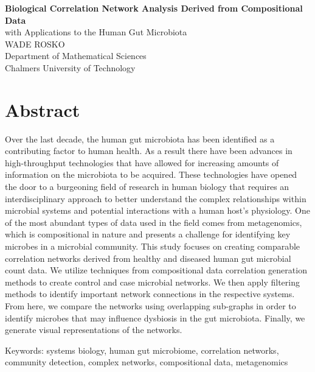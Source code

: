 
\textbf{Biological Correlation Network Analysis Derived from Compositional Data}\\
with Applications to the Human Gut Microbiota\\
WADE ROSKO\\
Department of Mathematical Sciences\\
Chalmers University of Technology \setlength{\parskip}{0.5cm}

\thispagestyle{plain}			%
\setlength{\parskip}{0pt plus 1.0pt}
\section*{Abstract}
Over the last decade, the human gut microbiota has been identified as a contributing factor to human health. As a result there have been advances in high-throughput technologies that have allowed for increasing amounts of information on the microbiota to be acquired. These technologies have opened the door to a burgeoning field of research in human biology that requires an interdisciplinary approach to better understand the complex relationships within microbial systems and potential interactions with a human host's physiology. One of the most abundant types of data used in the field comes from metagenomics, which is compositional in nature and presents a challenge for identifying key microbes in a microbial community. This study focuses on creating comparable correlation networks derived from healthy and diseased human gut microbial count data. We utilize techniques from compositional data correlation generation methods to create control and case microbial networks. We then apply filtering methods to identify important network connections in the respective systems. From here, we compare the networks using overlapping sub-graphs in order to identify microbes that may influence dysbiosis in the gut microbiota. Finally, we generate visual representations of the networks.

\vfill
Keywords: systems biology, human gut microbiome, correlation networks, community detection, complex networks, compositional data, metagenomics

\newpage				%
\thispagestyle{empty}
\mbox{}